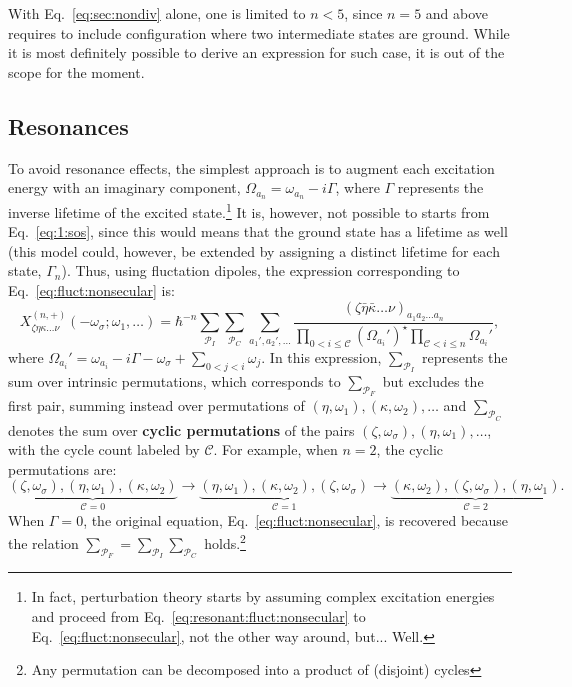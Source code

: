 \documentclass[12pt,a4paper]{article}
\begin{document}
With Eq.~\eqref{eq:sec:nondiv}  alone, one is limited to $n<5$, since $n=5$ and above requires to include configuration where two intermediate states are ground. While it is most definitely possible to derive an expression for such case, it is out of the scope for the moment.

\subsection{Resonances}

To avoid resonance effects, the simplest approach is to augment each excitation energy with an imaginary component, $\Omega_{a_n} = \omega_{a_n} - i\Gamma$, where $\Gamma$ represents the inverse lifetime of the excited state.\footnote{In fact, perturbation theory starts by assuming complex excitation energies and proceed from Eq.~\eqref{eq:resonant:fluct:nonsecular} to Eq.~\eqref{eq:fluct:nonsecular}, not the other way around, but... Well.} It is, however, not possible to starts from Eq.~\eqref{eq:1:sos}, since this would means that the ground state has a lifetime as well (this model could, however, be extended by assigning a distinct lifetime for each state, $\Gamma_n$). 
Thus, using fluctation dipoles, the expression corresponding to Eq.~\eqref{eq:fluct:nonsecular} is:\begin{equation}
X^{(n,+)}_{\zeta \eta \kappa \ldots \nu}(-\omega_\sigma; \omega_1, \ldots) = \hbar^{-n} \sum_{\mathcal{P}_I}\sum_{\mathcal{P}_C} \sum_{a_1', a_2', \ldots} \frac{(\zeta \bar{\eta} \bar{\kappa} \ldots \nu)_{a_1 a_2 \ldots a_n}}{\prod_{0 < i \leq \mathcal C} (\Omega_{a_i}')^\star \prod_{\mathcal C < i \leq n} \Omega_{a_i}'},\label{eq:resonant:fluct:nonsecular}
\end{equation}
where $\Omega_{a_i}' = \omega_{a_i} - i\Gamma - \omega_\sigma + \sum_{0 < j < i} \omega_j$.
In this expression, $\sum_{\mathcal{P}_I}$ represents the sum over intrinsic permutations, which corresponds to $\sum_{\mathcal{P}_F}$ but excludes the first pair, summing instead over permutations of $(\eta, \omega_1), (\kappa, \omega_2), \ldots$ and $\sum_{\mathcal{P}_C}$ denotes the sum over \textbf{cyclic permutations} of the pairs $(\zeta, \omega_\sigma), (\eta, \omega_1), \ldots$, with the cycle count labeled by $\mathcal{C}$.
For example, when $n = 2$, the cyclic permutations are:
\begin{equation*}
\underbrace{(\zeta,\omega_\sigma),(\eta,\omega_1),(\kappa,\omega_2)}_{\mathcal{C} = 0} \rightarrow \underbrace{(\eta,\omega_1),(\kappa,\omega_2),(\zeta,\omega_\sigma)}_{\mathcal{C} = 1} \rightarrow \underbrace{(\kappa,\omega_2),(\zeta,\omega_\sigma),(\eta,\omega_1)}_{\mathcal{C} = 2}.
\end{equation*}
When $\Gamma = 0$, the original equation, Eq.~\eqref{eq:fluct:nonsecular}, is recovered because the relation $\sum_{\mathcal{P}_F} = \sum_{\mathcal{P}_I} \sum_{\mathcal{P}_C}$ holds.\footnote{Any permutation can be decomposed into a product of (disjoint) cycles} 
\end{document}
